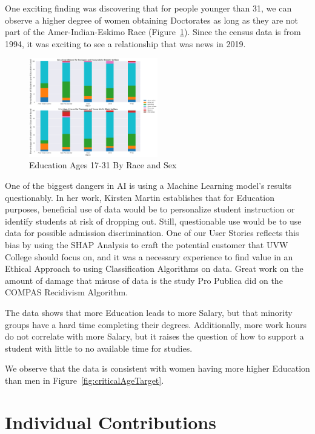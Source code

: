 \documentclass{IEEEtran}
\begin{document}
One exciting finding was discovering that for people younger than 31, we can observe a higher degree of women obtaining Doctorates as long as they are not part of the Amer-Indian-Eskimo Race (Figure~\ref{fig:EducationByRace}). Since the census data is from 1994, it was exciting to see a relationship that was news in 2019\cite{hess_2019}.

\begin{figure}[!t]
  \centering
  \captionsetup{justification=centering}
  \includegraphics[width=0.5\textwidth]{educationByRace.png}%
  \caption{Education Ages 17-31 By Race and Sex}%
  \label{fig:EducationByRace}%
\end{figure}

One of the biggest dangers in AI is using a Machine Learning model's results questionably. In her work\cite{martin2015ethical}, Kirsten Martin establishes that for Education purposes, beneficial use of data would be to personalize student instruction or identify students at risk of dropping out. Still, questionable use would be to use data for possible admission discrimination. One of our User Stories reflects this bias by using the SHAP Analysis to craft the potential customer that UVW College should focus on, and it was a necessary experience to find value in an Ethical Approach to using Classification Algorithms on data. Great work on the amount of damage that misuse of data is the study Pro Publica did on the COMPAS Recidivism Algorithm\cite{angwin_larson_mattu_kirchner_2016}.

The data shows that more Education leads to more Salary, but that minority groups have a hard time completing their degrees. Additionally, more work hours do not correlate with more Salary, but it raises the question of how to support a student with little to no available time for studies.

We observe that the data is consistent with women having more higher Education than men in Figure~\ref{fig:criticalAgeTarget}. 

\section{Individual Contributions}
\end{document}
